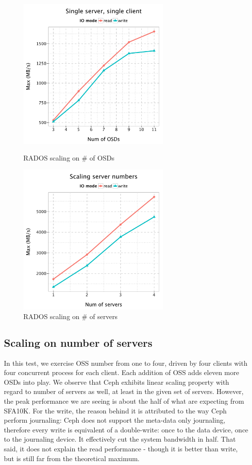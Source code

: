 \documentclass{article}
\begin{document}
\begin{figure}[H]
\centering
\begin{minipage}[t]{0.5\linewidth}
\centering
\includegraphics[width=3in]{data/rados_osd}
\caption{RADOS scaling on \# of OSDs}
\label{fig:osd-scale}
\end{minipage}%
\begin{minipage}[t]{0.5\linewidth}
\centering
\includegraphics[width=3in]{data/rados_server}
\caption{RADOS scaling on \# of servers}
\label{fig:oss-scale}
\end{minipage}%
\end{figure}

\subsection{Scaling on number of servers}

In this test, we exercise OSS number from one to four, driven by four clients with four
concurrent process for each client. Each addition of OSS adds eleven more OSDs into
play. We observe that Ceph exhibits linear scaling property with regard to
number of servers as well, at least in the given set of servers. However, the peak
performance we are seeing is about the half of what are expecting from SFA10K.
For the write, the reason behind it is attributed to the way Ceph perform
journaling: Ceph does not support the meta-data only journaling, therefore every
write is equivalent of a double-write: once to the data device, once to the
journaling device. It effectively cut the system bandwidth in half. That said,
it does not explain the read performance - though it is better than write, but is
still far from the theoretical maximum.
\end{document}
